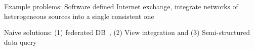 \todo

Example problems: Software defined Internet exchange, integrate
networks of heterogeneous sources into a single consistent one

Naive solutions: (1) federated DB~\cite{Sheth:1990:federated-DB}, (2)
View integration and (3) Semi\hyp{}structured data
query~\cite{McHugh:1997:Lore-DB,Abiteboul97queryingsemi-structured,Buneman:semi-structured}






